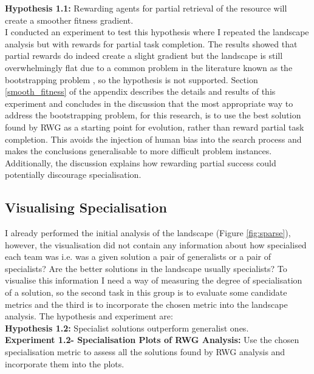 \documentclass[12pt]{article}
\begin{document}
\textbf{Hypothesis 1.1:} Rewarding agents for partial retrieval of the resource will create a smoother fitness gradient.\\

I conducted an experiment to test this hypothesis where I repeated the landscape analysis but with rewards for partial task completion.
The results showed that partial rewards do indeed create a slight gradient but the landscape is still overwhelmingly flat due to a common problem in the literature known as the bootstrapping problem \cite{Silva:EC:2016,Wei:ALR:2019} , so the hypothesis is not supported.
Section \ref{smooth_fitness} of the appendix describes the details and results of this experiment and concludes in the discussion that the most appropriate way to address the bootstrapping problem, for this research, is to use the best solution found by RWG as a starting point for evolution, rather than reward partial task completion. 
This avoids the injection of human bias into the search process and makes the conclusions generalisable to more difficult problem instances.
Additionally, the discussion explains how rewarding partial success could potentially discourage specialisation.

\subsection{Visualising Specialisation}\label{visualising_specialisation}

I already performed the initial analysis of the landscape (Figure \ref{fig:sparse}), however, the visualisation did not contain any information about how specialised each team was i.e. was a given solution a pair of generalists or a pair of specialists? 
Are the better solutions in the landscape usually specialists? 
To visualise this information I need a way of measuring the degree of specialisation of a solution, so the second task in this group is to evaluate some candidate metrics and the third is to incorporate the chosen metric into the landscape analysis.
The hypothesis and experiment are:\\

\textbf{Hypothesis 1.2:} Specialist solutions outperform generalist ones.\\

\textbf{Experiment 1.2- Specialisation Plots of RWG Analysis:}  Use the chosen specialisation metric to assess all the solutions found by RWG analysis and incorporate them into the plots.\\
\end{document}
